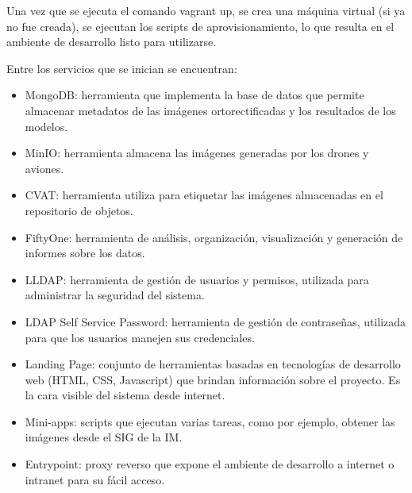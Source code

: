 Una vez que se ejecuta el comando vagrant up, se crea una máquina virtual (si ya no fue creada), se ejecutan los scripts de aprovisionamiento, lo que resulta en el ambiente de desarrollo listo para utilizarse.

Entre los servicios que se inician se encuentran:

\begin{itemize}
  \item MongoDB: herramienta que implementa la base de datos que permite almacenar metadatos de las imágenes ortorectificadas y los resultados de los modelos.
  \item MinIO: herramienta almacena las imágenes generadas por los drones y aviones.
  \item CVAT: herramienta utiliza para etiquetar las imágenes almacenadas en el repositorio de objetos.
  \item FiftyOne: herramienta de análisis, organización, visualización y generación de informes sobre los datos.
  \item LLDAP: herramienta de gestión de usuarios y permisos, utilizada para administrar la seguridad del sistema.
  \item LDAP Self Service Password: herramienta de gestión de contraseñas, utilizada para que los usuarios manejen sus credenciales.
  \item Landing Page: conjunto de herramientas basadas en tecnologías de desarrollo web (HTML, CSS, Javascript) que brindan información sobre el proyecto. Es la cara visible del sistema desde internet.
  \item Mini-apps: scripts que ejecutan varias tareas, como por ejemplo, obtener las imágenes desde el SIG de la IM.
  \item Entrypoint: proxy reverso que expone el ambiente de desarrollo a internet o intranet para su fácil acceso.
\end{itemize}



